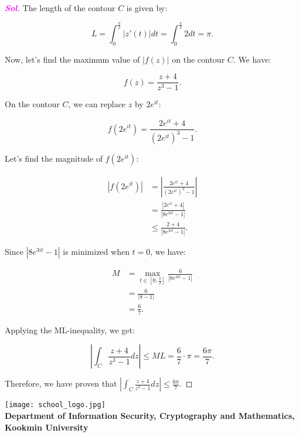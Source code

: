 \documentclass{article}
\newcommand{\footer}[1]{
\begin{flushright}
	\vspace{2em}
	\texttt{[image: school\_logo.jpg]} \\
	\vspace{1em}
	\textcolor{blue2}{\small\textbf{#1}}
\end{flushright}
}
\theoremstyle{definition}
\newcommand{\sol}{\textcolor{magenta}{\bf Sol}}
\begin{document}
\begin{enumerate}
\begin{proof}[\sol]
		The length of the contour $C$ is given by:
		
		\[
		L = \int_0^{\frac{\pi}{2}} |z'(t)| dt = \int_0^{\frac{\pi}{2}} 2 dt = \pi.
		\]
		
		Now, let's find the maximum value of $|f(z)|$ on the contour $C$. We have:
		
		\[
		f(z) = \frac{z + 4}{z^3 - 1}.
		\]
		
		On the contour $C$, we can replace $z$ by $2e^{it}$:
		
		\[
		f(2e^{it}) = \frac{2e^{it} + 4}{(2e^{it})^3 - 1}.
		\]
		
		Let's find the magnitude of $f(2e^{it})$:
		
		\begin{align*}
			\left|f(2e^{it})\right| &= \left|\frac{2e^{it} + 4}{(2e^{it})^3 - 1}\right| \\
			&= \frac{|2e^{it} + 4|}{|8e^{3it} - 1|} \\
			&\leq \frac{2 + 4}{|8e^{3it} - 1|}.
		\end{align*}
		
		Since $|8e^{3it} - 1|$ is minimized when $t = 0$, we have:
		
		\begin{align*}
			M &= \max_{t \in [0, \frac{\pi}{2}]} \frac{6}{|8e^{3it} - 1|} \\
			&= \frac{6}{|8 - 1|} \\
			&= \frac{6}{7}.
		\end{align*}
		
		Applying the ML-inequality, we get:
		
		\[
		\left|\int_C \frac{z + 4}{z^3 - 1} dz\right| \leq ML = \frac{6}{7} \cdot \pi = \frac{6\pi}{7}.
		\]
		
		Therefore, we have proven that $\left|\int_C \frac{z + 4}{z^3 - 1} dz\right| \leq \frac{6\pi}{7}$.
		
	\end{proof}
\end{enumerate}

\footer{Department of Information Security, Cryptography and Mathematics, Kookmin University}
\end{document}
